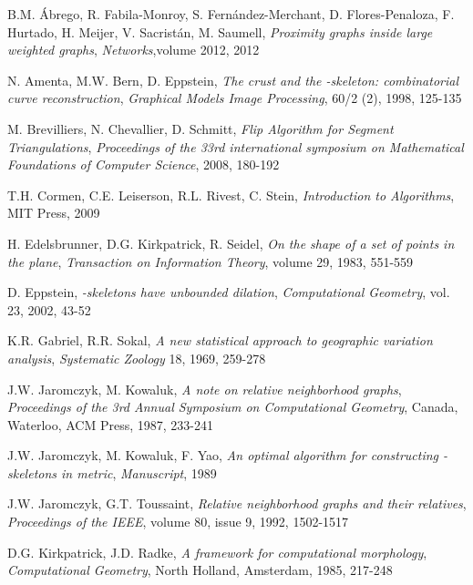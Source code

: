 \documentclass[11pt]{llncs}
\begin{document}

\begin{thebibliography}{99999}

B.M. Ábrego, R. Fabila-Monroy, S. Fernández-Merchant, D. Flores-Penaloza, 
F. Hurtado, H. Meijer, V. Sacristán, M. Saumell, 
\textit{Proximity graphs inside large weighted graphs}, 
\textit{Networks},volume 2012, 2012

N. Amenta, M.W. Bern, D. Eppstein, 
\textit{The crust and the -skeleton: combinatorial curve reconstruction}, 
\textit{Graphical Models Image Processing}, 60/2 (2), 1998, 125-135

M. Brevilliers, N. Chevallier, D. Schmitt,
\textit{Flip Algorithm for Segment Triangulations},
\textit{Proceedings of the 33rd international symposium on Mathematical Foundations of Computer Science}, 2008, 180-192

T.H. Cormen, C.E. Leiserson, R.L. Rivest, C. Stein, 
\textit{Introduction to Algorithms}, 
MIT Press, 2009

H. Edelsbrunner, D.G. Kirkpatrick, R. Seidel, 
\textit{On the shape of a set of points in the plane}, 
\textit{Transaction on Information Theory}, volume 29, 1983, 551-559

D. Eppstein, 
\textit{-skeletons have unbounded dilation}, 
\textit{Computational Geometry}, vol. 23, 2002, 43-52


K.R. Gabriel, R.R. Sokal, 
\textit{A new statistical approach to geographic variation analysis}, 
\textit{Systematic Zoology} 18, 1969, 259-278



J.W. Jaromczyk, M. Kowaluk, 
\textit{A note on relative neighborhood graphs}, 
\textit{Proceedings of the 3rd Annual Symposium on Computational Geometry}, Canada, Waterloo, 
ACM Press, 1987, 233-241 

J.W. Jaromczyk, M. Kowaluk, F. Yao, 
\textit{An optimal algorithm for constructing -skeletons in  metric},
 \textit{Manuscript}, 1989

J.W. Jaromczyk, G.T. Toussaint, 
\textit{Relative neighborhood graphs and their relatives}, 
\textit{Proceedings of the IEEE}, volume 80, issue 9, 1992, 1502-1517

D.G. Kirkpatrick, J.D. Radke, 
\textit{A framework for computational morphology}, 
\textit{Computational Geometry}, North Holland, Amsterdam, 1985, 217-248




\end{thebibliography}
\end{document}
